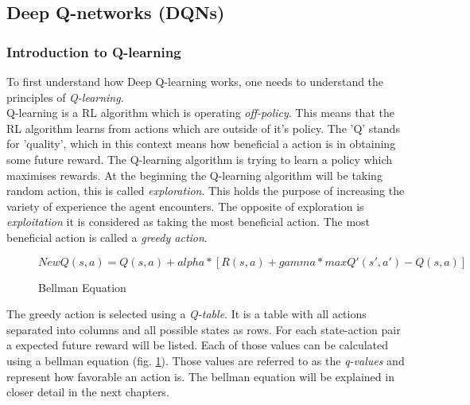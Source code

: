 \documentclass[12pt]{article}
\def\alpha{alpha}%
\def\gamma{gamma}%
\begin{document}
\subsection{Deep Q-networks (DQNs)}
\subsubsection{Introduction to Q-learning}
To first understand how Deep Q-learning works, one needs to understand the principles of \textit{Q-learning}.\\
Q-learning is a RL algorithm which is operating \textit{off-policy}. This means that the RL algorithm learns from actions which are outside of it's policy. The 'Q' stands for 'quality', which in this context means how beneficial a action is in obtaining some future reward. The Q-learning algorithm is trying to learn a policy which maximises rewards. At the beginning the Q-learning algorithm will be taking random action, this is called \textit{exploration}. This holds the purpose of increasing the variety of experience the agent encounters. The opposite of exploration is \textit{exploitation} it is considered as taking the most beneficial action. The most beneficial action is called a \textit{greedy action}. \cite{rl_q-learning} \\
\begin{figure}
\[NewQ(s,a) = Q(s, a) + \alpha * [R(s, a) + \gamma * maxQ'(s', a') - Q(s, a)]\]
\caption{Bellman Equation}
\label{BellmanEqu}
\end{figure}
The greedy action is selected using a \textit{Q-table}. It is a table with all actions separated into columns and all possible states as rows. For each state-action pair a expected future reward will be listed. Each of those values can be calculated using a bellman equation (fig. \ref{BellmanEqu}). Those values are referred to as the \textit{q-values} and represent how favorable an action is. The bellman equation will be explained in closer detail in the next chapters.  \cite{rl_q-table} 
\end{document}
